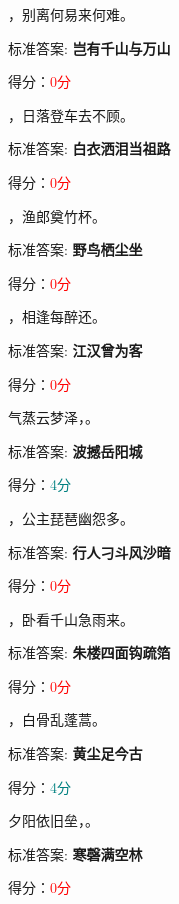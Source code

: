 \documentclass[12pt, a4paper, addpoints, answers]{exam}
\begin{document}
\begin{questions}
\question[4] \fillin ，别离何易来何难。

标准答案: \textbf{岂有千山与万山}   

得分：\textcolor{red}{0分} 

\question[4] \fillin ，日落登车去不顾。

标准答案: \textbf{白衣洒泪当祖路}   

得分：\textcolor{red}{0分} 

\question[4] \fillin ，渔郎奠竹杯。

标准答案: \textbf{野鸟栖尘坐}   

得分：\textcolor{red}{0分} 

\question[4] \fillin ，相逢每醉还。

标准答案: \textbf{江汉曾为客}   

得分：\textcolor{red}{0分} 

\question[4] 气蒸云梦泽，\fillin[波撼岳阳城] 。

标准答案: \textbf{波撼岳阳城}   

得分：\textcolor{teal}{4分} 

\question[4] \fillin ，公主琵琶幽怨多。

标准答案: \textbf{行人刁斗风沙暗}   

得分：\textcolor{red}{0分} 

\question[4] \fillin[朱楼四面勾疏箔] ，卧看千山急雨来。

标准答案: \textbf{朱楼四面钩疏箔}   

得分：\textcolor{red}{0分} 

\question[4] \fillin[黄尘足今古] ，白骨乱蓬蒿。

标准答案: \textbf{黄尘足今古}   

得分：\textcolor{teal}{4分} 

\question[4] 夕阳依旧垒，\fillin 。

标准答案: \textbf{寒磬满空林}   

得分：\textcolor{red}{0分} 
\end{questions}

\hspace{5cm}
\end{document}
